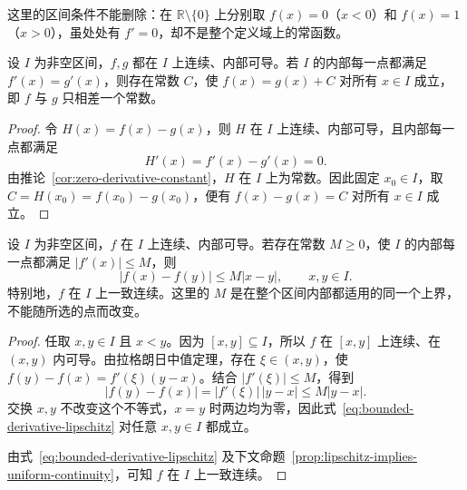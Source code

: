 这里的区间条件不能删除：在 $\mathbb{R}\setminus\{0\}$ 上分别取 $f(x)=0$（$x<0$）和 $f(x)=1$（$x>0$），虽处处有 $f'=0$，却不是整个定义域上的常函数。

\begin{corollary}[导数相等]
\label{cor:equal-derivatives-constant-difference}
设 $I$ 为非空区间，$f,g$ 都在 $I$ 上连续、内部可导。若 $I$ 的内部每一点都满足 $f'(x)=g'(x)$，则存在常数 $C$，使 $f(x)=g(x)+C$ 对所有 $x\in I$ 成立，即 $f$ 与 $g$ 只相差一个常数。
\end{corollary}

\begin{proof}
令 $H(x)=f(x)-g(x)$，则 $H$ 在 $I$ 上连续、内部可导，且内部每一点都满足
\[
    H'(x)=f'(x)-g'(x)=0.
\]
由推论~\ref{cor:zero-derivative-constant}，$H$ 在 $I$ 上为常数。因此固定 $x_0\in I$，取 $C=H(x_0)=f(x_0)-g(x_0)$，便有 $f(x)-g(x)=C$ 对所有 $x\in I$ 成立。
\end{proof}

\begin{corollary}[导数有界]
\label{cor:bounded-derivative-lipschitz}
设 $I$ 为非空区间，$f$ 在 $I$ 上连续、内部可导。若存在常数 $M\geq0$，使 $I$ 的内部每一点都满足 $|f'(x)|\leq M$，则
\begin{equation}
    |f(x)-f(y)|\leq M|x-y|,\qquad x,y\in I.
    \label{eq:bounded-derivative-lipschitz}
\end{equation}
特别地，$f$ 在 $I$ 上一致连续。这里的 $M$ 是在整个区间内部都适用的同一个上界，不能随所选的点而改变。
\end{corollary}

\begin{proof}
任取 $x,y\in I$ 且 $x<y$。因为 $[x,y]\subseteq I$，所以 $f$ 在 $[x,y]$ 上连续、在 $(x,y)$ 内可导。由拉格朗日中值定理，存在 $\xi\in(x,y)$，使 $f(y)-f(x)=f'(\xi)(y-x)$。结合 $|f'(\xi)|\leq M$，得到
\[
    |f(y)-f(x)|=|f'(\xi)|\,|y-x|\leq M|y-x|.
\]
交换 $x,y$ 不改变这个不等式，$x=y$ 时两边均为零，因此式~\eqref{eq:bounded-derivative-lipschitz} 对任意 $x,y\in I$ 都成立。

由式~\eqref{eq:bounded-derivative-lipschitz} 及下文命题~\ref{prop:lipschitz-implies-uniform-continuity}，可知 $f$ 在 $I$ 上一致连续。
\end{proof}

